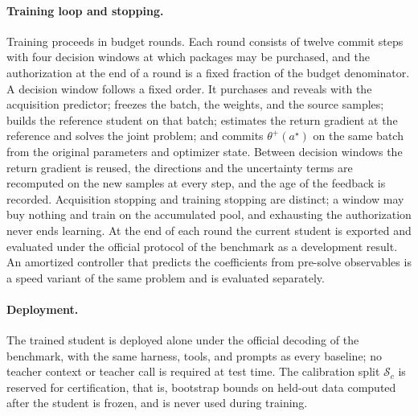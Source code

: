 \paragraph{Training loop and stopping.}
Training proceeds in budget rounds. Each round consists of twelve
commit steps with four decision windows at which packages may be
purchased, and the authorization at the end of a round is a fixed
fraction of the budget denominator. A decision window follows a fixed
order. It purchases and reveals with the acquisition predictor;
freezes the batch, the weights, and the source samples; builds the
reference student on that batch; estimates the return gradient at the
reference and solves the joint problem; and commits
$\theta^{+}(a^{\star})$ on the same batch from the original
parameters and optimizer state. Between decision windows the return
gradient is reused, the directions and the uncertainty terms are
recomputed on the new samples at every step, and the age of the
feedback is recorded. Acquisition stopping and training stopping are
distinct; a window may buy nothing and train on the accumulated pool,
and exhausting the authorization never ends learning. At the end of
each round the current student is exported and evaluated under the
official protocol of the benchmark as a development result. An
amortized controller that predicts the coefficients from
pre-solve observables is a speed variant of the same problem and is
evaluated separately.

\paragraph{Deployment.}
The trained student is deployed alone under the official decoding of
the benchmark, with the same harness, tools, and prompts as every
baseline; no teacher context or teacher call is required at test
time. The calibration split $\mathcal{S}_c$ is reserved for
certification, that is, bootstrap bounds on held-out data computed
after the student is frozen, and is never used during training.
